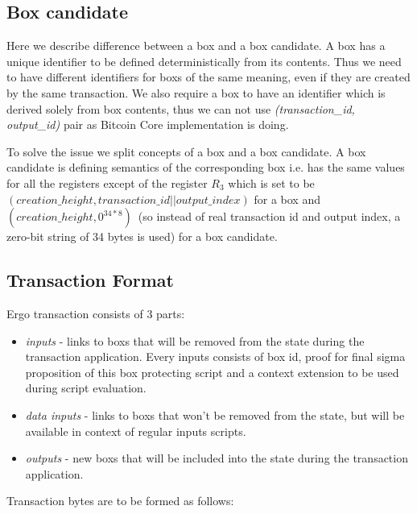 \documentclass[]{article}   %
\newcommand{\coin}{box}
\newcommand{\Coin}{Box}
\begin{document}
\subsection{\Coin{} candidate}
\label{coin-candidate}

Here we describe difference between a \coin{} and a \coin{} candidate. A \coin{} has a unique identifier to be defined
deterministically from its contents. Thus we need to have different identifiers for \coin{}s of the same meaning, even
if they are created by the same transaction. We also require a \coin{} to have an identifier which is derived solely
from \coin{} contents, thus we can not use {\em (transaction\_id, output\_id)} pair as Bitcoin Core implementation is
doing.

To solve the issue we split concepts of a \coin{} and a \coin{} candidate. A \coin{} candidate is defining semantics of
the corresponding \coin{} i.e. has the same values for all the registers except of the register $R_3$ which is set to
be $(creation\_height, transaction\_id || output\_index)$ for a \coin{} and $(creation\_height, 0^{34*8})$~(so instead
of real transaction id and output index, a zero-bit string of 34 bytes is used) for a \coin{} candidate.


\subsection{Transaction Format}
\label{tx-format}

Ergo transaction consists of 3 parts:

\begin{itemize}
    \item{\em inputs} - links to \coin{}s that will be removed from the state during the transaction application.
    Every inputs consists of \coin{} id, proof for final sigma proposition of this \coin{} protecting script
    and a context extension to be used during script evaluation.
    \item{\em data inputs} - links to \coin{}s that won't be removed from the state, but will be available
    in context of regular inputs scripts.
    \item{\em outputs} - new \coin{}s that will be included into the state during the transaction application.
\end{itemize}

Transaction bytes are to be formed as follows:
\end{document}
